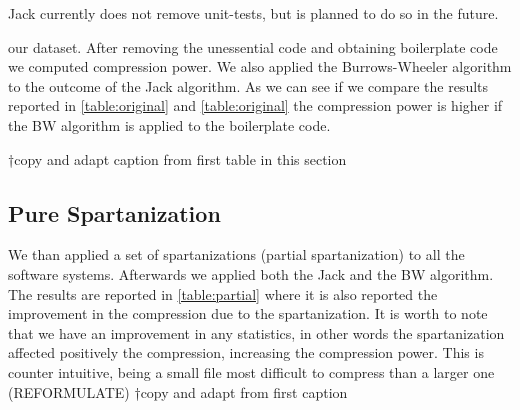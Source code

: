 Jack currently does not remove unit-tests, but is planned to do so in the
future.

our dataset. After removing the unessential code and obtaining boilerplate code
we computed compression power. We also applied the Burrows-Wheeler algorithm to
the outcome of the Jack algorithm. As we can see if we compare the results
reported in \cref{table:original} and \cref{table:original} the compression
power is higher if the BW algorithm is applied to the boilerplate code.

  \matteo†{copy and adapt caption from first table in this section}
\begin{table}
  \caption{The results of the compression using the Jack algorithm alone and
  both Jack and Burrows-Wheeler algorithms combined}
  \label{table:original}
  \par\vspace{10pt plus 6pt minus 4pt}
  \centering
\end{table}

\subsection{Pure Spartanization}

We than applied a set of spartanizations (partial spartanization) to all the
software systems. Afterwards we applied both the Jack and the BW algorithm.
The results are reported in \cref{table:partial} where it is also
reported the improvement in the compression due to the spartanization. It is
worth to note that we have an improvement in any statistics, in other words the
spartanization affected positively the compression, increasing the compression
power. This is counter intuitive, being a small file most difficult to
compress than a larger one (REFORMULATE)
  \matteo†{copy and adapt from first caption}

